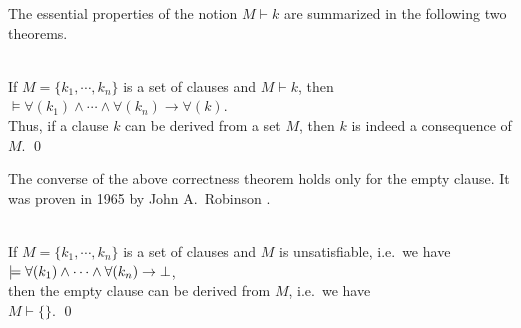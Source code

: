 The essential properties of the notion $M \vdash k$ are summarized in the following two theorems.

\begin{Satz}  \hspace*{\fill} \\
    If $M = \{k_1,\cdots,k_n\}$ is a set of clauses and $M \vdash k$, then \\[0.2cm]
    \hspace*{1.3cm} $\models \forall(k_1) \wedge \cdots \wedge \forall(k_n) \rightarrow \forall(k)$. \\[0.2cm]
    Thus, if a clause $k$ can be derived from a set $M$, 
    then $k$ is indeed a consequence of $M$. \qed
\end{Satz}

\noindent
The converse of the above correctness theorem holds only for the empty clause. It was proven in 1965 by John
A.~Robinson \cite{robinson:1965}. 
\begin{Satz}
   \hspace*{\fill} \\
  If $M = \{k_1,\cdots,k_n\}$ is a set of clauses and $M$ is unsatisfiable, i.e.~we have
  \\[0.2cm]
  \hspace*{1.3cm}
  $\models \forall(k_1) \wedge \cdots \wedge \forall(k_n) \rightarrow \bot$, 
  \\[0.2cm]
  then the empty clause can be derived from $M$, i.e.~we have
  \\[0.2cm]
  \hspace*{1.3cm} $M \vdash \{\}$.     \qed
\end{Satz}

